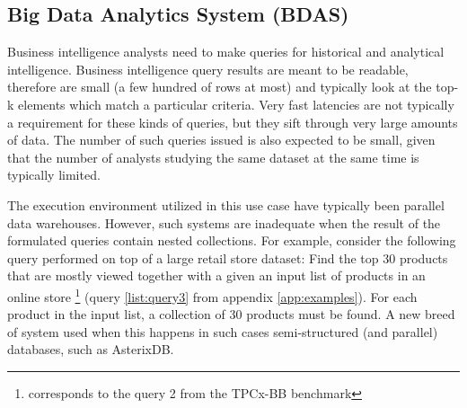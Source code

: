 
\subsection{Big Data Analytics System (BDAS)} 

Business intelligence analysts need to make queries for historical and analytical intelligence.  Business intelligence query results are meant to be readable, therefore are small  (a few hundred of rows at most) and typically look at the top-k elements which match a particular criteria. Very fast latencies are not typically a requirement for these kinds of queries, but they sift through very large amounts of data. The number of such queries issued is also expected to be small, given that the number of analysts studying the same dataset at the same time is typically limited.

The execution environment utilized in this use case have typically been parallel data warehouses. However, such systems are inadequate when the result of the formulated queries contain nested collections. For example, consider the following query performed on top of a large retail store dataset: Find the top 30 products that are mostly viewed together with a given an input list of products in an online store \footnote{corresponds to the query 2 from the TPCx-BB benchmark} (query \ref{list:query3} from appendix \ref{app:examples}). For each product in the input list, a collection of 30 products must be found. A new breed of system used when this happens in such cases semi-structured (and parallel) databases, such as AsterixDB.

